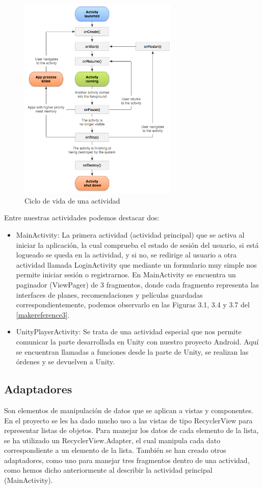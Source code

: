 \begin{figure}[H]
    \centering
    \includegraphics[width=3in]{figures/chapter-4/activity_lifecycle.png}
    \caption{Ciclo de vida de una actividad}
\end{figure}

Entre nuestras actividades podemos destacar dos: 
\begin{itemize}
    \item MainActivity: La primera actividad (actividad principal) que se activa al iniciar la aplicación, la cual comprueba el estado de sesión del usuario, si está logueado se queda en la actividad, y si no, se redirige al usuario a otra actividad llamada LoginActivity que mediante un formulario muy simple nos permite iniciar sesión o registrarnos. En MainActivity se encuentra un paginador (ViewPager) de 3 fragmentos, donde cada fragmento representa las interfaces de planes, recomendaciones y películas guardadas correspondientemente, podemos observarlo en las Figuras 3.1, 3.4 y 3.7 del \autoref{makereference3}.
    \item UnityPlayerActivity: Se trata de una actividad especial que nos permite comunicar la parte desarrollada en Unity con nuestro proyecto Android. Aquí se encuentran llamadas a funciones desde la parte de Unity, se realizan las órdenes y se devuelven a Unity.
\end{itemize} 

\subsection{Adaptadores}
\label{makereference4.4.2} 
Son elementos de manipulación de datos que se aplican a vistas y componentes. En el proyecto se les ha dado mucho uso a las vistas de tipo RecyclerView para representar listas de objetos. Para manejar los datos de cada elemento de la lista, se ha utilizado un RecyclerView.Adapter, el cual manipula cada dato correspondiente a un elemento de la lista. También se han creado otros adaptadores, como uno para manejar tres fragmentos dentro de una actividad, como hemos dicho anteriormente al describir la actividad principal (MainActivity).

